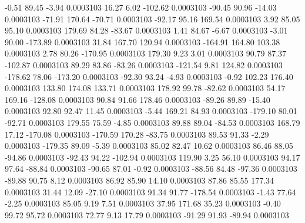        -0.51       89.45       -3.94     0.0003103
       16.27        6.02     -102.62     0.0003103
      -90.45       90.96      -14.03     0.0003103
      -71.91      170.64      -70.71     0.0003103
      -92.17       95.16      169.54     0.0003103
        3.92       85.05       95.10     0.0003103
      179.69       84.28      -83.67     0.0003103
        1.41       84.67       -6.67     0.0003103
       -3.01       90.00     -173.89     0.0003103
       31.84      167.70      120.94     0.0003103
     -164.91      164.80      103.38     0.0003103
        2.78       80.26     -170.95     0.0003103
      179.30        9.23        3.01     0.0003103
       90.79       87.37     -102.87     0.0003103
       89.29       83.86      -83.26     0.0003103
     -121.54        9.81      124.82     0.0003103
     -178.62       78.06     -173.20     0.0003103
      -92.30       93.24       -4.93     0.0003103
       -0.92      102.23      176.40     0.0003103
      133.80      174.08      133.71     0.0003103
      178.92       99.78      -82.62     0.0003103
       54.17      169.16     -128.08     0.0003103
       90.84       91.66      178.46     0.0003103
      -89.26       89.89      -15.40     0.0003103
       92.80       92.47       11.45     0.0003103
       -5.44      169.21       84.93     0.0003103
     -179.10       80.01      -92.71     0.0003103
      179.55       75.59       -4.85     0.0003103
       89.88       89.04      -84.53     0.0003103
      168.79       17.12     -170.08     0.0003103
     -170.59      170.28      -83.75     0.0003103
       89.53       91.33       -2.29     0.0003103
     -179.35       89.09       -5.39     0.0003103
       85.02       82.47       10.62     0.0003103
       86.46       88.05      -94.86     0.0003103
      -92.43       94.22     -102.94     0.0003103
      119.90        3.25       56.10     0.0003103
       94.17       97.64      -88.84     0.0003103
      -90.65       87.01       -0.92     0.0003103
      -88.56       84.48      -97.36     0.0003103
      -89.88       90.75        8.12     0.0003103
       86.92       85.90       14.10     0.0003103
       87.86       85.55      177.34     0.0003103
       31.44       12.09      -27.10     0.0003103
       91.34       91.77     -178.54     0.0003103
       -1.43       77.64       -2.25     0.0003103
       85.05        9.19        7.51     0.0003103
       37.95      171.68       35.23     0.0003103
       -0.40       99.72       95.72     0.0003103
       72.77        9.13       17.79     0.0003103
      -91.29       91.93      -89.94     0.0003103
